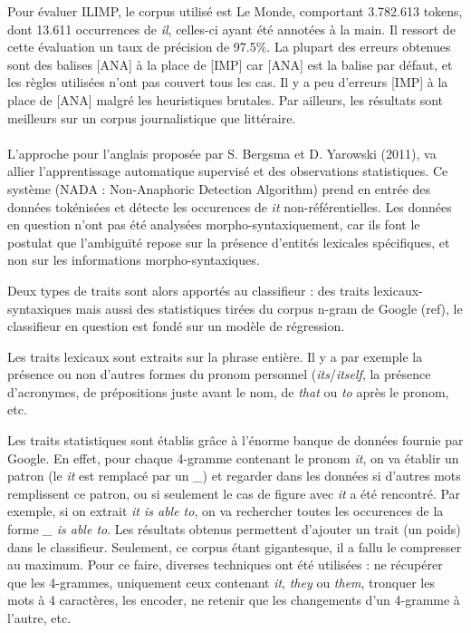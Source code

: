 \documentclass[a4paper,12pt]{article}
\begin{document}
Pour évaluer ILIMP, le corpus utilisé est Le Monde, comportant 3.782.613 tokens, dont 13.611 occurrences de \og{}\textit{il}\fg{}, celles-ci ayant été annotées à la main. Il ressort de cette évaluation un taux de précision de 97.5\%. La plupart des erreurs obtenues sont des balises [ANA] à la place de [IMP] car [ANA] est la balise par défaut, et les règles utilisées n'ont pas couvert tous les cas. Il y a peu d'erreurs [IMP] à la place de [ANA] malgré les heuristiques brutales.
Par ailleurs, les résultats sont meilleurs sur un corpus journalistique que littéraire.


\paragraph{}
L'approche pour l'anglais proposée par S. Bergsma et D. Yarowski (2011), va allier l'apprentissage automatique supervisé et des observations statistiques.
Ce système (NADA : Non-Anaphoric Detection Algorithm) prend en entrée des données tokénisées et détecte les occurences de \og{}\textit{it}\fg{} non-référentielles. Les données en question n'ont pas été analysées morpho-syntaxiquement, car ils font le postulat que l'ambiguïté repose sur la présence d'entités lexicales spécifiques, et non sur les informations morpho-syntaxiques.

Deux types de traits sont alors apportés au classifieur : des traits lexicaux-syntaxiques mais aussi des statistiques tirées du corpus n-gram de Google (ref), le classifieur en question est fondé sur un modèle de régression.

Les traits lexicaux sont extraits sur la phrase entière. Il y a par exemple la présence ou non d'autres formes du pronom personnel (\textit{its}/\textit{itself}, la présence d'acronymes, de prépositions juste avant le nom, de \og{}\textit{that}\fg{} ou \og{}\textit{to}\fg{} après le pronom, etc.

Les traits statistiques sont établis grâce à l'énorme banque de données fournie par Google. En effet, pour chaque 4-gramme contenant le pronom \og{}\textit{it}\fg{}, on va établir un patron (le \og{}\textit{it}\fg{} est remplacé par un \og{}\textit{\_}\fg{}) et regarder dans les données si d'autres mots remplissent ce patron, ou si seulement le cas de figure avec \og{}\textit{it}\fg{} a été rencontré. Par exemple, si on extrait \og{}\textit{it is able to}\fg{}, on va rechercher toutes les occurences de la forme \og{}\textit{\_ is able to}\fg{}.
Les résultats obtenus permettent d'ajouter un trait (un poids) dans le classifieur.
Seulement, ce corpus étant gigantesque, il a fallu le compresser au maximum. Pour ce faire, diverses techniques ont été utilisées : ne récupérer que les 4-grammes, uniquement ceux contenant \og{}\textit{it}\fg{}, \og{}\textit{they}\fg{} ou \og{}\textit{them}\fg{}, tronquer les mots à 4 caractères, les encoder, ne retenir que les changements d'un 4-gramme à l'autre, etc.
\end{document}
